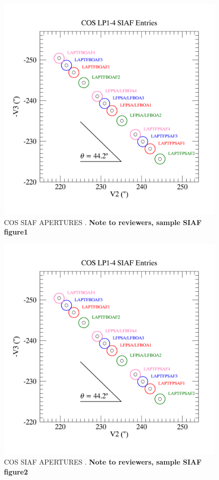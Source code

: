 \begin{figure}[htb]
\noindent\includegraphics*[width=0.795\linewidth]{extrasiaf/LP4_SIAF_positions.png}
\caption[OPTIONAL:SIAF1]{COS SIAF APERTURES \label{fig:SIAF1}.
{\bf Note to reviewers, sample SIAF figure1} }
\end{figure}
\begin{figure}[htb]
\noindent\includegraphics*[width=0.795\linewidth]{extrasiaf/LP4_SIAF_positions.png}
\caption[OPTIONAL:SIAF2]{COS SIAF APERTURES \label{fig:SIAF2}.
{\bf Note to reviewers, sample SIAF figure2} }
\end{figure}


